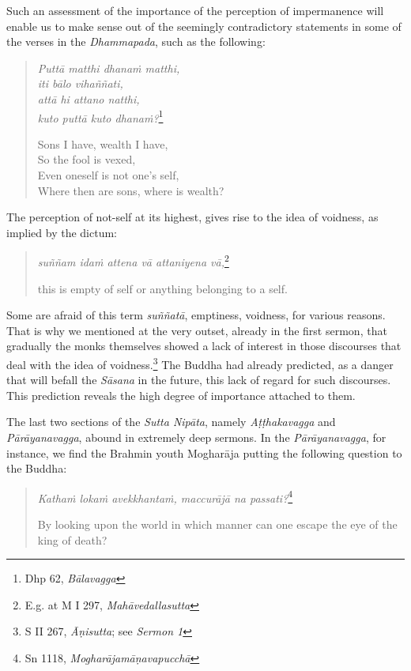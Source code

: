 Such an assessment of the importance of the perception of impermanence will enable us to make sense out of the seemingly contradictory statements in some of the verses in the \emph{Dhammapada}, such as the following:

\clearpage

\begin{quote}
\emph{Puttā matthi dhanaṁ matthi,}\\
\emph{iti bālo vihaññati,}\\
\emph{attā hi attano natthi,}\\
\emph{kuto puttā kuto dhanaṁ?}\footnote{Dhp 62, \emph{Bālavagga}}

Sons I have, wealth I have,\\
So the fool is vexed,\\
Even oneself is not one's self,\\
Where then are sons, where is wealth?
\end{quote}

The perception of not-self at its highest, gives rise to the idea of voidness, as implied by the dictum:

\begin{quote}
\emph{suññam idaṁ attena vā attaniyena vā,}\footnote{E.g. at M I 297, \emph{Mahāvedallasutta}}

this is empty of self or anything belonging to a self.
\end{quote}

Some are afraid of this term \emph{suññatā}, emptiness, voidness, for various reasons. That is why we mentioned at the very outset, already in the first sermon, that gradually the monks themselves showed a lack of interest in those discourses that deal with the idea of voidness.\footnote{S II 267, \emph{Āṇisutta}; see \emph{Sermon 1}} The Buddha had already predicted, as a danger that will befall the \emph{Sāsana} in the future, this lack of regard for such discourses. This prediction reveals the high degree of importance attached to them.

The last two sections of the \emph{Sutta Nipāta}, namely \emph{Aṭṭhakavagga} and \emph{Pārāyanavagga}, abound in extremely deep sermons. In the \emph{Pārāyanavagga}, for instance, we find the Brahmin youth Mogharāja putting the following question to the Buddha:

\begin{quote}
\emph{Kathaṁ lokaṁ avekkhantaṁ, maccurājā na passati?}\footnote{Sn 1118, \emph{Mogharājamāṇavapucchā}}

By looking upon the world in which manner can one escape the eye of the king of death?
\end{quote}

